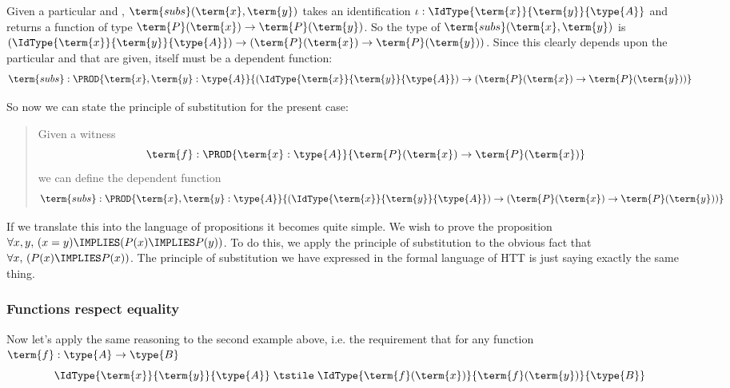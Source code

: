 Given a particular  and , 
$\term{subs}(\term{x}, \term{y})$ takes an identification $\iota:\IdType{\term{x}}{\term{y}}{\type{A}}$ and returns a function of type $\term{P}(\term{x}) \to \term{P}(\term{y})$.  So the type of  $\term{subs}(\term{x}, \term{y})$ is 
$(\IdType{\term{x}}{\term{y}}{\type{A}}) \to 
(\term{P}(\term{x}) \to \term{P}(\term{y}))$.  
Since this clearly depends upon the particular  and  that are given,  itself must be a dependent function:
\[
\term{subs}:\PROD{\term{x},\term{y}:\type{A}}
{(\IdType{\term{x}}{\term{y}}{\type{A}}) \to 
(\term{P}(\term{x}) \to \term{P}(\term{y}))}
\]



So now we can state the principle of substitution for the present case:
\begin{quote}
Given 
a witness
\[
\term{f}:\PROD{\term{x}:\type{A}}
{\term{P}(\term{x}) \to \term{P}(\term{x})}
\]
we can define the dependent function
\[
\term{subs}:\PROD{\term{x},\term{y}:\type{A}}
{(\IdType{\term{x}}{\term{y}}{\type{A}}) \to 
(\term{P}(\term{x}) \to \term{P}(\term{y}))}
\]
\end{quote}
If we translate this into the language of propositions it becomes quite simple.  We wish to prove the proposition $
\forall x,y,\, (x = y) \IMPLIES (P(x) \IMPLIES P(y))
$.  
To do this, we apply the principle of substitution to the obvious fact that
$
\forall x,\, (P(x) \IMPLIES P(x))
$.  
The principle of substitution we have expressed in the formal language of HTT is just saying exactly the same thing.


\newpage
\subsubsection{Functions respect equality}

Now let's apply the same reasoning to the second example above, i.e. the requirement that for any function $\term{f}: \type{A} \to \type{B}$
\[ 
\IdType{\term{x}}{\term{y}}{\type{A}}
	\;\tstile\;
\IdType
{\term{f}(\term{x})}
{\term{f}(\term{y})}
{\type{B}}
\]

